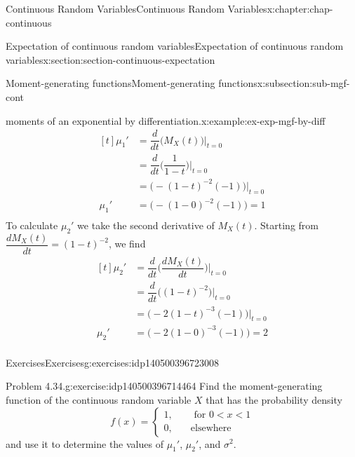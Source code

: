 \documentclass[oneside,10pt,]{book}
\newcommand{\lt}{<}
\newcommand{\amp}{&}
\begin{document}
\begin{chapterptx}{Continuous Random Variables}{}{Continuous Random Variables}{}{}{x:chapter:chap-continuous}
\begin{sectionptx}{Expectation of continuous random variables}{}{Expectation of continuous random variables}{}{}{x:section:section-continuous-expectation}
\begin{subsectionptx}{Moment-generating functions}{}{Moment-generating functions}{}{}{x:subsection:sub-mgf-cont}
\begin{example}{moments of an exponential by differentiation.}{x:example:ex-exp-mgf-by-diff}
\begin{equation*}
\begin{aligned}[t]
\mu_1' \amp = \dfrac{d}{dt}\Big(M_X(t)\Big)\Big|_{t=0}\\
\amp = \dfrac{d}{dt}\Big(\dfrac{1}{1-t}\Big)\Big|_{t=0}\\
\amp = \Big(-(1-t)^{-2}(-1)\Big)\Big|_{t=0}\\
\mu_1'  \amp = \Big(-(1-0)^{-2}(-1)\Big) = 1\\
\end{aligned}
\end{equation*}
To calculate \(\mu_2'\) we take the second derivative of \(M_X(t)\).  Starting from \(\dfrac{dM_X(t)}{dt} = (1-t)^{-2}\), we find%
\begin{equation*}
\begin{aligned}[t]
\mu_2' \amp = \dfrac{d}{dt}\Big(\dfrac{dM_X(t)}{dt}\Big)\Big|_{t=0}\\
\amp = \dfrac{d}{dt}\Big((1-t)^{-2}\Big)\Big|_{t=0}\\
\amp = \Big(-2(1-t)^{-3}(-1)\Big)\Big|_{t=0}\\
\mu_2'  \amp = \Big(-2(1-0)^{-3}(-1)\Big) = 2\\
\end{aligned}
\end{equation*}
\end{example}
\end{subsectionptx}
%
%
\typeout{************************************************}
\typeout{************************************************}
%
\begin{exercises-subsection}{Exercises}{}{Exercises}{}{}{g:exercises:idp140500396723008}
\begin{divisionexercise}{1}{Problem 4.34.}{}{g:exercise:idp140500396714464}%
Find the moment-generating function of the continuous random variable \(X\) that has the probability density%
\begin{equation*}
f(x) =
\begin{cases}1, \amp \quad \text{ for }0 \lt x \lt 1\\0, \amp \quad
\text{elsewhere}\end{cases}
\end{equation*}
and use it to determine the values of \(\mu_1'\), \(\mu_2'\), and \(\sigma^2\).%
\end{divisionexercise}%
\end{exercises-subsection}
\end{sectionptx}
%
%
\typeout{************************************************}

\end{chapterptx}
\end{document}
